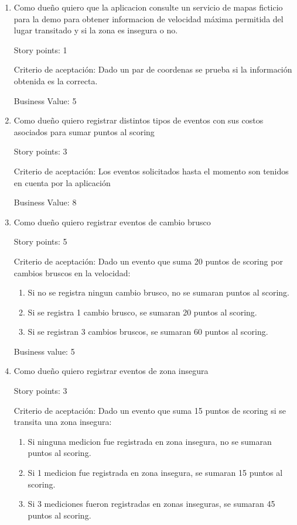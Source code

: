 \begin{enumerate}

\item Como dueño quiero que la aplicacion consulte un servicio de mapas ficticio para la demo para obtener informacion de velocidad máxima permitida del lugar transitado y si la zona es insegura o no.

Story points: 1

Criterio de aceptación:
Dado un par de coordenas se prueba si la información obtenida es la correcta.

Business Value: 5


\item Como dueño quiero registrar distintos tipos de eventos con sus costos asociados para sumar puntos al scoring

Story points: 3

Criterio de aceptación:
Los eventos solicitados hasta el momento son tenidos en cuenta por la aplicación

Business Value: 8


\item Como dueño quiero registrar eventos de cambio brusco

Story points: 5

Criterio de aceptación:
Dado un evento que suma 20 puntos de scoring por cambios bruscos en la velocidad:
\begin{enumerate} 
	\item Si no se registra ningun cambio brusco, no se sumaran puntos al scoring.
	\item Si se registra 1 cambio brusco, se sumaran 20 puntos al scoring.
	\item Si se registran 3 cambios bruscos, se sumaran 60 puntos al scoring.
\end{enumerate}

Business value: 5


\item Como dueño quiero registrar eventos de zona insegura

Story points: 3

Criterio de aceptación:
Dado un evento que suma 15 puntos de scoring si se transita una zona insegura:
\begin{enumerate}
	\item Si ninguna medicion fue registrada en zona insegura, no se sumaran puntos al scoring.
	\item Si 1 medicion fue registrada en zona insegura, se sumaran 15 puntos al scoring.
	\item Si 3 mediciones fueron registradas en zonas inseguras, se sumaran 45 puntos al scoring.
\end{enumerate}


\end{enumerate}
